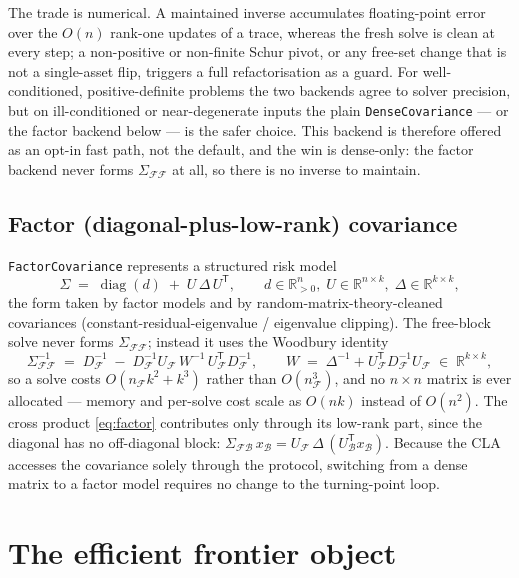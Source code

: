 \documentclass[11pt]{article}
\newcommand{\R}{\mathbb{R}}
\newcommand{\Sig}{\Sigma}
\newcommand{\F}{\mathcal{F}}        %
\newcommand{\B}{\mathcal{B}}        %
\newcommand{\trans}{^{\mathsf{T}}}
\newcommand{\inv}{^{-1}}
\begin{document}
The trade is numerical. A maintained inverse accumulates floating-point error over
the $O(n)$ rank-one updates of a trace, whereas the fresh solve is clean at every
step; a non-positive or non-finite Schur pivot, or any free-set change that is not
a single-asset flip, triggers a full refactorisation as a guard. For
well-conditioned, positive-definite problems the two backends agree to solver
precision, but on ill-conditioned or near-degenerate inputs the plain
\texttt{DenseCovariance} --- or the factor backend below --- is the safer choice.
This backend is therefore offered as an opt-in fast path, not the default, and the
win is dense-only: the factor backend never forms $\Sig_{\F\F}$ at all, so there is
no inverse to maintain.

\subsection{Factor (diagonal-plus-low-rank) covariance}

\texttt{FactorCovariance} represents a structured risk model
\begin{equation}
\label{eq:factor}
\Sig \;=\; \operatorname{diag}(d) \;+\; U\,\Delta\,U\trans,
\qquad d\in\R^{n}_{>0},\; U\in\R^{n\times k},\; \Delta\in\R^{k\times k},
\end{equation}
the form taken by factor models \citep{sharpe1963} and by random-matrix-theory-cleaned
covariances (constant-residual-eigenvalue / eigenvalue clipping). The free-block solve
never forms
$\Sig_{\F\F}$; instead it uses the Woodbury identity
\begin{equation}
\label{eq:woodbury}
\Sig_{\F\F}\inv \;=\; D_\F\inv \;-\; D_\F\inv U_\F\, W\inv\, U_\F\trans D_\F\inv,
\qquad
W \;=\; \Delta\inv + U_\F\trans D_\F\inv U_\F \;\in\;\R^{k\times k},
\end{equation}
so a solve costs $O(n_\F k^2 + k^3)$ rather than $O(n_\F^3)$, and no $n\times n$ matrix
is ever allocated --- memory and per-solve cost scale as $O(nk)$ instead of $O(n^2)$.
The cross product \eqref{eq:factor} contributes only through its low-rank part, since
the diagonal has no off-diagonal block:
\(
\Sig_{\F\B}\,x_\B = U_\F\,\Delta\,(U_\B\trans x_\B).
\)
Because the CLA accesses the covariance solely through the protocol, switching from a
dense matrix to a factor model requires no change to the turning-point loop.

\section{The efficient frontier object}
\end{document}
